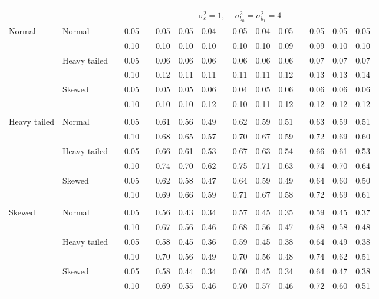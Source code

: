 \documentclass[12pt]{article} %
\begin{document}
\begin{table}[ht]
\begin{scriptsize}
\begin{center}
\begin{tabular}{ll p{.1cm} c p{.1cm} rrr p{.1cm} rrr p{.1cm} rrr}
&&&&&&&&&&&&&&&\\
& && && \multicolumn{9}{c}{$\sigma_{\varepsilon}^2 = 1$, \ \ $\sigma_{b_0}^2 = \sigma_{b_1}^2 = 4$} \\ \cline{6-16}
\rowcolor{gray!20}Normal       & Normal       && 0.05 &&   0.05 & 0.05 & 0.04 && 0.05 & 0.04 & 0.05 &&  0.05 & 0.05 & 0.05 \\
\rowcolor{gray!20}             &              && 0.10 &&   0.10 & 0.10 & 0.10 && 0.10 & 0.10 & 0.09 &&  0.09 & 0.10 & 0.10 \\
\rowcolor{gray!20}             & Heavy tailed && 0.05 &&   0.06 & 0.06 & 0.06 && 0.06 & 0.06 & 0.06 &&  0.07 & 0.07 & 0.07 \\
\rowcolor{gray!20}             &              && 0.10 &&   0.12 & 0.11 & 0.11 && 0.11 & 0.11 & 0.12 &&  0.13 & 0.13 & 0.14 \\
\rowcolor{gray!20}             & Skewed       && 0.05 &&   0.05 & 0.05 & 0.06 && 0.04 & 0.05 & 0.06 &&  0.06 & 0.06 & 0.06 \\
\rowcolor{gray!20}             &              && 0.10 &&   0.10 & 0.10 & 0.12 && 0.10 & 0.11 & 0.12 &&  0.12 & 0.12 & 0.12 \\
             &&&&&&&&&&&&&&&\\
Heavy tailed & Normal       && 0.05 &&   0.61 & 0.56 & 0.49 && 0.62 & 0.59 & 0.51 &&  0.63 & 0.59 & 0.51 \\
             &              && 0.10 &&   0.68 & 0.65 & 0.57 && 0.70 & 0.67 & 0.59 &&  0.72 & 0.69 & 0.60 \\
             & Heavy tailed && 0.05 &&   0.66 & 0.61 & 0.53 && 0.67 & 0.63 & 0.54 &&  0.66 & 0.61 & 0.53 \\
             &              && 0.10 &&   0.74 & 0.70 & 0.62 && 0.75 & 0.71 & 0.63 &&  0.74 & 0.70 & 0.64 \\
             & Skewed       && 0.05 &&   0.62 & 0.58 & 0.47 && 0.64 & 0.59 & 0.49 &&  0.64 & 0.60 & 0.50 \\
             &              && 0.10 &&   0.69 & 0.66 & 0.59 && 0.71 & 0.67 & 0.58 &&  0.72 & 0.69 & 0.61 \\
             &&&&&&&&&&&&&&&\\
Skewed       & Normal       && 0.05 &&   0.56 & 0.43 & 0.34 && 0.57 & 0.45 & 0.35 &&   0.59 & 0.45 & 0.37 \\
             &              && 0.10 &&   0.67 & 0.56 & 0.46 && 0.68 & 0.56 & 0.47 &&   0.68 & 0.58 & 0.48 \\
             & Heavy tailed && 0.05 &&   0.58 & 0.45 & 0.36 && 0.59 & 0.45 & 0.38 &&   0.64 & 0.49 & 0.38 \\
             &              && 0.10 &&   0.70 & 0.56 & 0.49 && 0.70 & 0.56 & 0.48 &&   0.74 & 0.62 & 0.51 \\
             & Skewed       && 0.05 &&   0.58 & 0.44 & 0.34 && 0.60 & 0.45 & 0.34 &&   0.64 & 0.47 & 0.38 \\
             &              && 0.10 &&   0.69 & 0.55 & 0.46 && 0.70 & 0.57 & 0.46 &&   0.72 & 0.60 & 0.51 \\



\end{tabular}
\end{center}
\end{scriptsize}
\end{table}
\end{document}
